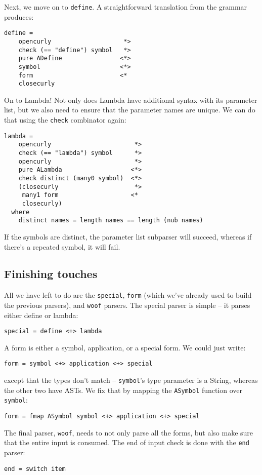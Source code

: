 \documentclass{tmr}
\begin{document}
Next, we move on to \verb+define+.
A straightforward translation from the grammar produces:
\begin{verbatim}
define =
    opencurly                    *>
    check (== "define") symbol   *>
    pure ADefine                <*>
    symbol                      <*>
    form                        <*
    closecurly
\end{verbatim}

On to Lambda!  Not only does Lambda have additional syntax with its parameter 
list, but we also need to ensure that the parameter names are unique.  We can 
do that using the \verb+check+ combinator again:
\begin{verbatim}
lambda = 
    opencurly                       *>
    check (== "lambda") symbol      *>
    opencurly                       *>
    pure ALambda                   <*>
    check distinct (many0 symbol)  <*>
    (closecurly                     *>
     many1 form                    <*
     closecurly)
  where
    distinct names = length names == length (nub names)
\end{verbatim}
If the symbols are distinct, the parameter list subparser will succeed,
whereas if there's a repeated symbol, it will fail.

\subsection{Finishing touches}
All we have left to do are the \verb+special+, \verb+form+ (which 
we've already used to build the previous parsers), and \verb+woof+ parsers.  
The special parser is simple -- it parses either define or lambda:
\begin{verbatim}
special = define <+> lambda
\end{verbatim}

A form is either a symbol, application, or a special form.  We could just write:
\begin{verbatim}
form = symbol <+> application <+> special
\end{verbatim}

except that the types don't match -- \verb+symbol+'s type parameter is a String, 
whereas the other two have ASTs.  We fix that by mapping the \verb+ASymbol+ 
function over \verb+symbol+:
\begin{verbatim}
form = fmap ASymbol symbol <+> application <+> special
\end{verbatim}

The final parser, \verb+woof+, needs to not only parse all the forms, but also 
make sure that the entire input is consumed.  The end of input check is done 
with the \verb+end+ parser:
\begin{verbatim}
end = switch item
\end{verbatim}
\end{document}

